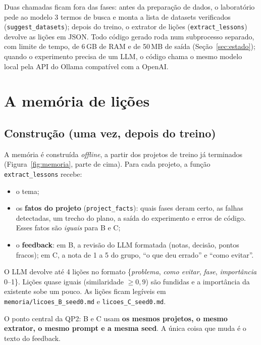 \documentclass[11pt,a4paper]{article}
\begin{document}
Duas chamadas ficam fora das fases: antes da preparação de dados, o laboratório pede ao modelo 3
termos de busca e monta a lista de datasets verificados (\texttt{suggest\_datasets}); depois do
treino, o extrator de lições (\texttt{extract\_lessons}) devolve as lições em JSON. Todo código
gerado roda num subprocesso separado, com limite de tempo, de 6\,GB de RAM e de 50\,MB de saída
(Seção~\ref{sec:estado}); quando o experimento precisa de um LLM, o código chama o mesmo modelo
local pela API do Ollama compatível com a OpenAI.

\section{A memória de lições}

\subsection{Construção (uma vez, depois do treino)}

A memória é construída \emph{offline}, a partir dos projetos de treino já terminados
(Figura~\ref{fig:memoria}, parte de cima). Para cada projeto, a função
\texttt{extract\_lessons} recebe:

\begin{itemize}
  \item o tema;
  \item os \textbf{fatos do projeto} (\texttt{project\_facts}): quais fases deram certo, as
        falhas detectadas, um trecho do plano, a saída do experimento e erros de código.
        Esses fatos são \emph{iguais} para B e C;
  \item o \textbf{feedback}: em B, a revisão do LLM formatada (notas, decisão, pontos
        fracos); em C, a nota de 1 a 5 do grupo, ``o que deu errado'' e ``como evitar''.
\end{itemize}

O LLM devolve até 4 lições no formato
\{\emph{problema}, \emph{como evitar}, \emph{fase}, \emph{importância} 0--1\}. Lições quase
iguais (similaridade $\geq 0{,}9$) são fundidas e a importância da existente sobe um
pouco. As lições ficam legíveis em \texttt{memoria/licoes\_B\_seed0.md} e
\texttt{licoes\_C\_seed0.md}.

O ponto central da QP2: B e C usam \textbf{os mesmos projetos, o mesmo extrator, o mesmo
prompt e a mesma seed}. A única coisa que muda é o texto do feedback.
\end{document}
